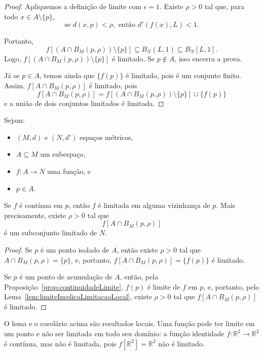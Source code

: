 \begin{proof}
    Apliquemos a definição de limite com $\epsilon=1$.
    Existe $\rho>0$ tal que, para todo $x\in A\setminus\{p\}$,
    \[
        \text{se }d(x,p)<\rho,\text{ então } d'(f(x),L)<1.
    \]

    Portanto,
    \[
        f[(A\cap B_M(p,\rho))\setminus\{p\}]\subseteq B_N(L,1)\subseteq B_N[L,1].
    \]
    Logo, $f[(A\cap B_M(p,\rho))\setminus\{p\}]$ é limitado.
    Se $p\notin A$, isso encerra a prova.

    Já se $p\in A$, temos ainda que $\{f(p)\}$ é limitado, pois é um conjunto finito.
    Assim, $f[A\cap B_M(p,\rho)]$ é limitado, pois
    \[
        f[A\cap B_M(p,\rho)]
        =
        f[(A\cap B_M(p,\rho))\setminus\{p\}]\cup \{f(p)\}
    \]
    e a união de dois conjuntos limitados é limitada.
\end{proof}

\begin{corollary}\label{cor:continuidadeImplicaLimitacaoLocal}
    Sejam:
    \begin{itemize}
        \item $(M,d)$ e $(N,d')$ espaços métricos,
        \item $A\subseteq M$ um subespaço,
        \item $f:A\to N$ uma função, e
        \item $p\in A$.
    \end{itemize}

    Se $f$ é contínua em $p$, então $f$ é limitada em alguma vizinhança de $p$.
    Mais precisamente, existe $\rho>0$ tal que
    \[
        f[A\cap B_M(p,\rho)]
    \]
    é um subconjunto limitado de $N$.
\end{corollary}

\begin{proof}
    Se $p$ é um ponto isolado de $A$, então existe $\rho>0$ tal que $A\cap B_M(p,\rho)=\{p\}$, e, portanto, $f[A\cap B_M(p,\rho)]=\{f(p)\}$ é limitado.

    Se $p$ é um ponto de acumulação de $A$, então, pela Proposição~\ref{prop:continuidadeLimite}, $f(p)$ é limite de $f$ em $p$, e, portanto, pelo Lema~\ref{lem:limiteImplicaLimitacaoLocal}, existe $\rho>0$ tal que $f[A\cap B_M(p,\rho)]$ é limitado.
\end{proof}

O lema e o corolário acima são resultados locais.
Uma função pode ter limite em um ponto e não ser limitada em todo seu domínio: a função identidade $f:\mathbb R^2\to\mathbb R^2$ é contínua, mas não é limitada, pois $f[\mathbb R^2]=\mathbb R^2$ não é limitado.

